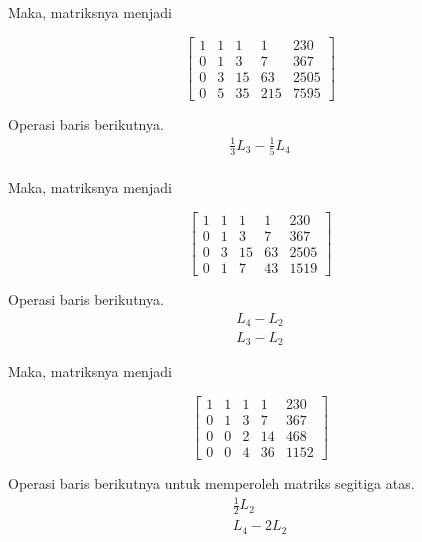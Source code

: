 Maka, matriksnya menjadi

\begin{center}
	\setlength\arraycolsep{15pt}
	\[
	\begin{bmatrix}
			1 	& 1 	& 1 	& 1 		& 230 		\\[1em]
			0 	& 1 	& 3 	& 7 		& 367			\\[1em]
			0 	& 3 	& 15 	& 63 		& 2505		\\[1em]
			0 	& 5 	& 35 	& 215 	& 7595
	\end{bmatrix}
	\]
\end{center}

Operasi baris berikutnya.
\begin{align*}
	\frac{1}{3}L_3 - \frac{1}{5}L_4 \\
\end{align*}

Maka, matriksnya menjadi

\begin{center}
	\setlength\arraycolsep{15pt}
	\[
	\begin{bmatrix}
			1 	& 1 	& 1 	& 1 		& 230 		\\[1em]
			0 	& 1 	& 3 	& 7 		& 367			\\[1em]
			0 	& 3 	& 15 	& 63 		& 2505		\\[1em]
			0 	& 1 	& 7 	& 43 		& 1519
	\end{bmatrix}
	\]
\end{center}

Operasi baris berikutnya.
\begin{align*}
	L_4 - L_2 \\
	L_3 - L_2
\end{align*}

Maka, matriksnya menjadi

\begin{center}
	\setlength\arraycolsep{15pt}
	\[
	\begin{bmatrix}
			1 	& 1 	& 1 	& 1 		& 230 		\\[1em]
			0 	& 1 	& 3 	& 7 		& 367			\\[1em]
			0 	& 0 	& 2 	& 14 		& 468		\\[1em]
			0 	& 0 	& 4 	& 36 		& 1152
	\end{bmatrix}
	\]
\end{center}

Operasi baris berikutnya untuk memperoleh matriks segitiga atas.
\begin{align*}
	\frac{1}{2}L_2 \\
	L_4 - 2L_2
\end{align*}

